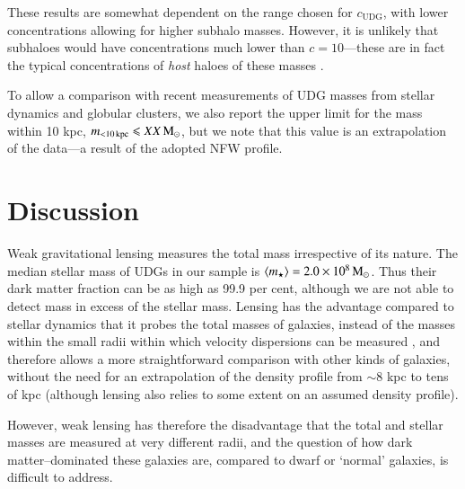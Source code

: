 \documentclass[usenatbib,fleqn]{mnras}
\def\udg{\mathrm{UDG}}
\def\percent{ per cent}
\begin{document}
These results are somewhat dependent on the range chosen for $c_\udg$, with lower concentrations allowing for higher subhalo masses. However, it is unlikely that subhaloes would have concentrations much lower than $c=10$---these are in fact the typical concentrations of \emph{host} haloes of these masses \citep[e.g.,][]{dutton14,moline16}.

To allow a comparison with recent measurements of UDG masses from stellar dynamics and globular clusters, we also report the upper limit for the mass within 10 kpc, $m_\mathrm{<10\,kpc}\leqslant XX\,\mathrm{M}_\odot$, but we note that this value is an extrapolation of the data---a result of the adopted NFW profile.



\section{Discussion}
\label{s:discussion}
 
Weak gravitational lensing measures the total mass irrespective of its nature. The median stellar mass of UDGs in our sample is $\langle m_\star \rangle = 2.0\times10^8\,\mathrm{M}_\odot$. Thus their dark matter fraction can be as high as 99.9\percent, although we are not able to detect mass in excess of the stellar mass. Lensing has the advantage compared to stellar dynamics that it probes the total masses of galaxies, instead of the masses within the small radii within which velocity dispersions can be measured \citep[e.g., roughly 8 kpc in the case of DF17 in the Coma cluster][]{beasley16_acs,peng16}, and therefore allows a more straightforward comparison with other kinds of galaxies, without the need for an extrapolation of the density profile from $\sim8$ kpc to tens of kpc (although lensing also relies to some extent on an assumed density profile).

However, weak lensing has therefore the disadvantage that the total and stellar masses are measured at very different radii, and the question of how dark matter--dominated these galaxies are, compared to dwarf or `normal' galaxies, is difficult to address.
\end{document}
